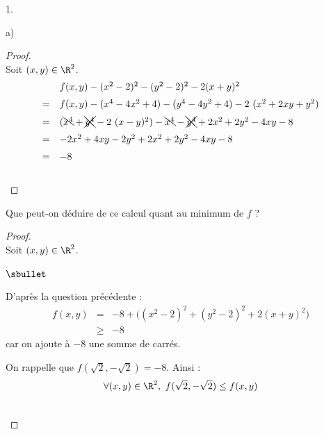 \documentclass[11pt]{article}%
\begin{document}
\begin{noliste}{1.}
\begin{noliste}{a)}
    \begin{proof}~\\%
      Soit $(x, y) \in \R^2$.
      \[
      \begin{array}{cl}
        & f(x, y) -(x^{2}-2)^{2}-(y^{2}-2)^{2}-2(x + y)^{2}
        \\[.2cm]
        = & f(x, y) -(x^4 - 4 x^2 + 4) - (y^4 - 4 y^2 + 4) - 2 \ (x^2
        + 2 xy + y^2)
        \\[.2cm]
        = & (\bcancel{x^4} + \xcancel{y^4} - 2 \ (x - y)^2) -
        \bcancel{x^4} - \xcancel{y^4} +2 x^2 + 2 y^2 -4  xy - 8
        \\[.2cm]
        = & - 2 x^2 + 4 xy - 2 y^2 + 2 x^2 + 2 y^2 -4  xy - 8
        \\[.2cm]
        = & - 8
      \end{array}
      \]
      ~\\[-1cm]
    \end{proof}




  \item Que peut-on déduire de ce calcul quant au minimum de $f$ ?

    \begin{proof}~\\
      Soit $(x, y) \in \R^2$.
      \begin{noliste}{$\sbullet$}
      \item D'après la question précédente :
        \[
        \begin{array}{rcl}
          f(x,y) & = & -8 + \Big( (x^{2}-2)^{2} + (y^{2}-2)^{2} + 2(x +
          y)^{2} \Big)
          \\[.2cm]
          & \geq & -8
        \end{array}
        \]
        car on ajoute à $-8$ une somme de carrés.
      \item On rappelle que $f(\sqrt{2}, -\sqrt{2}) = -8$. Ainsi : 
        \[
        \forall (x, y) \in \R^2, \ f(\sqrt{2}, -\sqrt{2}) \leq f(x, y)
        \]        
      \end{noliste}
      ~\\[-1cm]
    \end{proof}

  \end{noliste}


\end{noliste}
\end{document}
